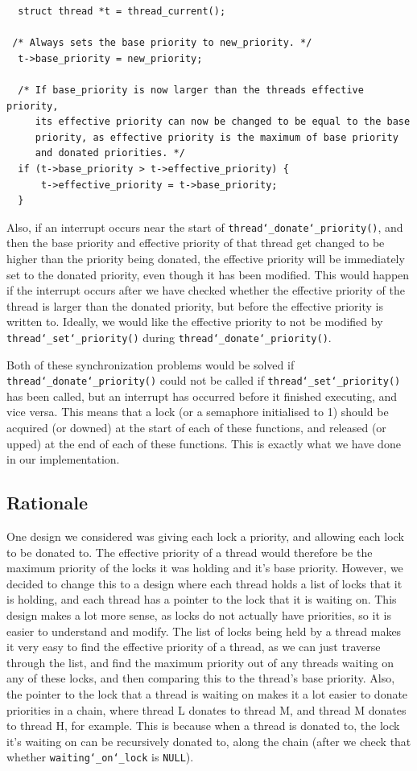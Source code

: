 \documentclass{article}
\renewcommand{\_}{\char`_}
\begin{document}
\begin{lstlisting}
  struct thread *t = thread_current();

 /* Always sets the base priority to new_priority. */
  t->base_priority = new_priority;

  /* If base_priority is now larger than the threads effective priority,
     its effective priority can now be changed to be equal to the base
     priority, as effective priority is the maximum of base priority
     and donated priorities. */
  if (t->base_priority > t->effective_priority) {
	  t->effective_priority = t->base_priority;
  }
\end{lstlisting}

Also, if an interrupt occurs near the start of \texttt{thread\_donate\_priority()}, and then the base priority and effective priority of that thread get changed to be higher than the priority being donated, the effective priority will be immediately set to the donated priority, even though it has been modified. This would happen if the interrupt occurs after we have checked whether the effective priority of the thread is larger than the donated priority, but before the effective priority is written to. Ideally, we would like the effective priority to not be modified by \texttt{thread\_set\_priority()} during \texttt{thread\_donate\_priority()}.

Both of these synchronization problems would be solved if \texttt{thread\_donate\_priority()} could not be called if \texttt{thread\_set\_priority()} has been called, but an interrupt has occurred before it finished executing, and vice versa. This means that a lock (or a semaphore initialised to 1) should be acquired (or downed) at the start of each of these functions, and released (or upped) at the end of each of these functions. This is exactly what we have done in our implementation.

\subsection{Rationale}

One design we considered was giving each lock a priority, and allowing each lock to be donated to. The effective priority of a thread would therefore be the maximum priority of the locks it was holding and it's base priority. However, we decided to change this to a design where each thread holds a list of locks that it is holding, and each thread has a pointer to the lock that it is waiting on. This design makes a lot more sense, as locks do not actually have priorities, so it is easier to understand and modify. The list of locks being held by a thread makes it very easy to find the effective priority of a thread, as we can just traverse through the list, and find the maximum priority out of any threads waiting on any of these locks, and then comparing this to the thread's base priority. Also, the pointer to the lock that a thread is waiting on makes it a lot easier to donate priorities in a chain, where thread L donates to thread M, and thread M donates to thread H, for example. This is because when a thread is donated to, the lock it's waiting on can be recursively donated to, along the chain (after we check that whether \texttt{waiting\_on\_lock} is \texttt{NULL}).
\end{document}

